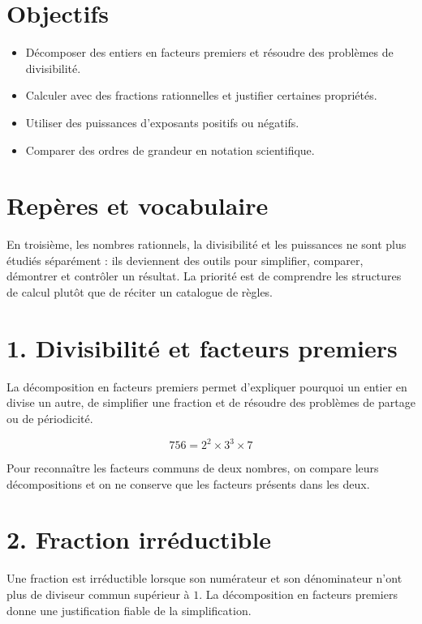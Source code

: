 
\section{Objectifs}
\begin{itemize}
\item Décomposer des entiers en facteurs premiers et résoudre des problèmes de divisibilité.
\item Calculer avec des fractions rationnelles et justifier certaines propriétés.
\item Utiliser des puissances d’exposants positifs ou négatifs.
\item Comparer des ordres de grandeur en notation scientifique.
\end{itemize}

\section{Repères et vocabulaire}
En troisième, les nombres rationnels, la divisibilité et les puissances ne sont plus étudiés séparément : ils deviennent des outils pour simplifier, comparer, démontrer et contrôler un résultat. La priorité est de comprendre les structures de calcul plutôt que de réciter un catalogue de règles.

\section{1. Divisibilité et facteurs premiers}
La décomposition en facteurs premiers permet d’expliquer pourquoi un entier en divise un autre, de simplifier une fraction et de résoudre des problèmes de partage ou de périodicité.

\[
756=2^2\times3^3\times7
\]

\begin{exemple}
Pour reconnaître les facteurs communs de deux nombres, on compare leurs décompositions et on ne conserve que les facteurs présents dans les deux.
\end{exemple}

\section{2. Fraction irréductible}
Une fraction est irréductible lorsque son numérateur et son dénominateur n’ont plus de diviseur commun supérieur à $1$. La décomposition en facteurs premiers donne une justification fiable de la simplification.

